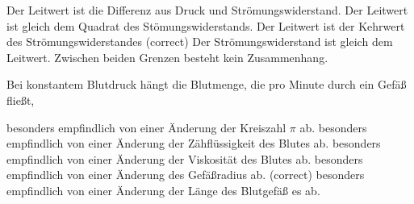 \documentclass[11pt]{exam}
\begin{document}
\begin{questions}
\begin{choices}
	\choice Der Leitwert ist die Differenz aus Druck und Strömungswiderstand.
	\choice Der Leitwert ist gleich dem Quadrat des Stömungswiderstands.
	\choice Der Leitwert ist der Kehrwert des Strömungswiderstandes (correct)
	\choice Der Strömungswiderstand ist gleich dem Leitwert.
	\choice Zwischen beiden Grenzen besteht kein Zusammenhang.
\end{choices}

\vspace{3mm}\question Bei konstantem Blutdruck hängt die Blutmenge, die pro Minute durch ein Gefäß fließt,

\begin{choices}
	\choice besonders empfindlich von einer Änderung der Kreiszahl \(\pi\) ab.
	\choice besonders empfindlich von einer Änderung der Zähflüssigkeit des Blutes ab.
	\choice besonders empfindlich von einer Änderung der Viskosität des Blutes ab.
	\choice besonders empfindlich von einer Änderung des Gefäßradius ab. (correct)
	\choice besonders empfindlich von einer Änderung der Länge des Blutgefäß es ab.
\end{choices}

\vspace{3mm}\end{questions}
\end{document}
